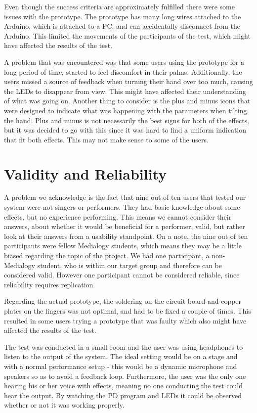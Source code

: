 Even though the success criteria are approximately fulfilled there were some issues with the prototype. The prototype has many long wires attached to the Arduino, which is attached to a PC, and can accidentally disconnect from the Arduino. This limited the movements of the participants of the test, which might have affected the results of the test.

A problem that was encountered was that some users using the prototype for a long period of time, started to feel discomfort in their palms. 
Additionally, the users missed a source of feedback when turning their hand over too much, causing the LEDs to disappear from view. This might have affected their understanding of what was going on.
Another thing to consider is the plus and minus icons that were designed to indicate what was happening with the parameters when tilting the hand. Plus and minus is not necessarily the best signs for both of the effects, but it was decided to go with this since it was hard to find a uniform indication that fit both effects. This may not make sense to some of the users.

\section{Validity and Reliability}

A problem we acknowledge is the fact that nine out of ten users that tested our system were not singers or performers. They had basic knowledge about some effects, but no experience performing. This means we cannot consider their answers, about whether it would be beneficial for a performer, valid, but rather look at their answers from a usability standpoint. On a note, the nine out of ten participants were fellow Medialogy students, which means they may be a little biased regarding the topic of the project.
We had one participant, a non-Medialogy student, who is within our target group and therefore can be considered valid. However one participant cannot be considered reliable, since reliability requires replication.

Regarding the actual prototype, the soldering on the circuit board and copper plates on the fingers was not optimal, and had to be fixed a couple of times. This resulted in some users  trying a prototype that was faulty which also might have affected the results of the test.

The test was conducted in a small room and the user was using headphones to listen to the output of the system. The ideal setting would be on a stage and with a normal performance setup - this would be a dynamic microphone and speakers so as to avoid a feedback loop. 
Furthermore, the user was the only one hearing his or her voice with effects, meaning no one conducting the test could hear the output. By watching the PD program and LEDs it could be observed whether or not it was working properly.

